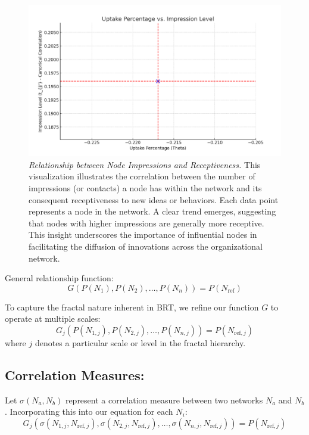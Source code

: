 \documentclass[sn-nature]{sn-jnl}%
\theoremstyle{thmstyleone}%
\theoremstyle{thmstyletwo}%
\theoremstyle{thmstylethree}%
\begin{document}
\begin{figure}[h!]
    \centering
    \includegraphics[width=1\linewidth]{uptake_percentage_vs_impression_level.png}
    \caption[Relationship between Node Impressions and Receptiveness]{\textit{Relationship between Node Impressions and Receptiveness.} This visualization illustrates the correlation between the number of impressions (or contacts) a node has within the network and its consequent receptiveness to new ideas or behaviors. Each data point represents a node in the network. A clear trend emerges, suggesting that nodes with higher impressions are generally more receptive. This insight underscores the importance of influential nodes in facilitating the diffusion of innovations across the organizational network.}

    \label{fig:uptakepercentage}
\end{figure}
General relationship function:
\[
G(P(N_1), P(N_2), \dots, P(N_n)) = P(N_{\text{ref}})
\]

To capture the fractal nature inherent in BRT, we refine our function \(G\) to operate at multiple scales:
\[
G_{j}(P(N_{1,j}), P(N_{2,j}), \dots, P(N_{n,j})) = P(N_{\text{ref},j})
\]
where \(j\) denotes a particular scale or level in the fractal hierarchy.

\subsection*{Correlation Measures:}
Let \(\sigma(N_a, N_b)\) represent a correlation measure between two networks \(N_a\) and \(N_b\). Incorporating this into our equation for each \(N_i\):
\[
G_{j}(\sigma(N_{1,j}, N_{\text{ref},j}), \sigma(N_{2,j}, N_{\text{ref},j}), \dots, \sigma(N_{n,j}, N_{\text{ref},j})) = P(N_{\text{ref},j})
\]
\end{document}
